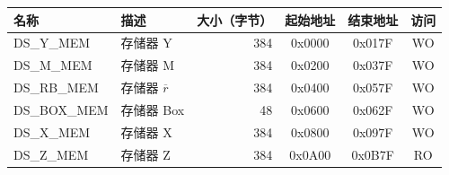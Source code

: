 \begin{longtable}{ | p{3cm} | p{3cm} | r | c | c | c | }
\hline
\rowcolor{lightgray}
名称 & 描述 &  大小（字节） & 起始地址 & 结束地址 & 访问 \\ \hline
{DS\_Y\_MEM}\label{DSYMEM}  & 存储器 Y  & 384  & 0x0000 & 0x017F & WO \\ \hline
{DS\_M\_MEM}\label{DSMMEM}  & 存储器 M  & 384  & 0x0200 & 0x037F & WO \\ \hline
{DS\_RB\_MEM}\label{DSRBMEM}  & 存储器 $\overline{r}$  & 384  & 0x0400 & 0x057F & WO \\ \hline
{DS\_BOX\_MEM}\label{DSBOXMEM}  & 存储器 Box  & 48  & 0x0600 & 0x062F & WO \\ \hline
{DS\_X\_MEM}\label{DSXMEM}  & 存储器 X  & 384  & 0x0800 & 0x097F & WO \\ \hline
{DS\_Z\_MEM}\label{DSZMEM}  & 存储器 Z  & 384  & 0x0A00 & 0x0B7F & RO \\ \hline
\end{longtable}
